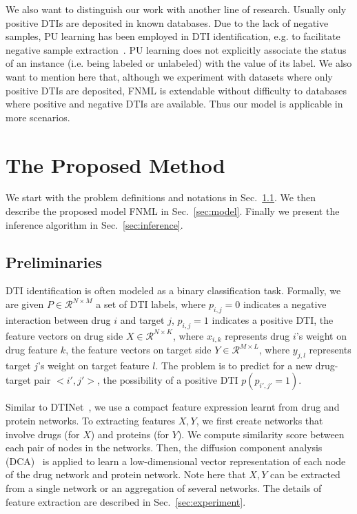 \documentclass[conference]{IEEEtran}
\begin{document}
We also want to distinguish our work with another line of research. Usually only positive DTIs are deposited in known databases. Due to the lack of negative samples, PU learning has been employed in DTI identification, e.g. to facilitate negative sample extraction~\cite{Peng2017Screening}. PU learning does not explicitly associate the status of an instance (i.e. being labeled or unlabeled) with the value of its label. We also want to mention here that, although we experiment with datasets where only positive DTIs are deposited, FNML is extendable without difficulty to databases where positive and negative DTIs are available. Thus our model is applicable in more scenarios.


\section{The Proposed Method}\label{sec:method}
We start with the problem definitions and notations in Sec.~\ref{sec:input}. We then describe the proposed model FNML in Sec.~\ref{sec:model}. Finally we present the inference algorithm in Sec.~\ref{sec:inference}.

\subsection{Preliminaries}\label{sec:input}
DTI identification is often modeled as a binary classification task. Formally, we are given $P\in \mathcal{R}^{N\times M}$ a set of DTI labels, where $p_{i,j}=0$ indicates a negative interaction between drug $i$ and target $j$, $p_{i,j}=1$ indicates a positive DTI, the feature vectors on drug side $X\in \mathcal{R}^{N \times K}$, where $x_{i,k}$ represents drug $i$'s weight on drug feature $k$, the feature vectors on target side $Y\in \mathcal{R}^{M \times L}$, where $y_{j,l}$ represents target $j$'s weight on target feature $l$. The problem is to predict for a new drug-target pair $<i',j'>$, the possibility of a positive DTI $p(p_{i',j'}=1)$.

Similar to DTINet~\cite{Luo2017Network}, we use a compact feature expression learnt from drug and protein networks. To extracting features $X,Y$, we first create networks that involve drugs (for $X$) and proteins (for $Y$). We compute similarity score between each pair of nodes in the networks. Then, the diffusion component analysis (DCA)~\cite{Cho2015DCA} is applied to learn a low-dimensional vector representation of each node of the drug network and protein network. Note here that $X,Y$ can be extracted from a single network or an aggregation of several networks. The details of feature extraction are described in Sec.~\ref{sec:experiment}.
\end{document}
